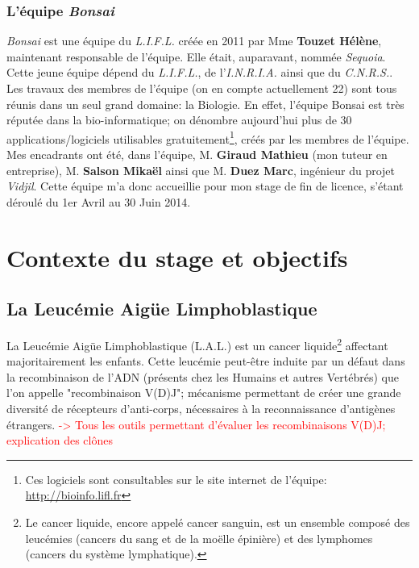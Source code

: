 \documentclass[12pt]{report}
\begin{document}
\begin{spacing}{1.2}
\subsection{L'équipe \textit{Bonsai}}
\textit{Bonsai} est une équipe du \textit{L.I.F.L.} créée en 2011 par Mme \textbf{Touzet Hélène}, maintenant responsable de l'équipe. Elle était, auparavant, nommée \textit{Sequoia}.
\newline
Cette jeune équipe dépend du \textit{L.I.F.L.}, de l'\textit{I.N.R.I.A.} ainsi que du \textit{C.N.R.S.}.
\newline
Les travaux des membres de l'équipe (on en compte actuellement 22) sont tous réunis dans un seul grand domaine: la Biologie.
\newline
En effet, l'équipe Bonsai est très réputée dans la bio-informatique; on dénombre aujourd'hui plus de 30 applications/logiciels utilisables gratuitement\footnote{Ces logiciels sont consultables sur le site internet de l'équipe: \url{http://bioinfo.lifl.fr}}, créés par les membres de l'équipe.
\newline
Mes encadrants ont été, dans l'équipe, M. \textbf{Giraud Mathieu} (mon tuteur en entreprise), M. \textbf{Salson Mikaël} ainsi que M. \textbf{Duez Marc}, ingénieur du projet \textit{Vidjil}.
\newline
Cette équipe m'a donc accueillie pour mon stage de fin de licence, s'étant déroulé du 1er Avril au 30 Juin 2014.


\chapter{Contexte du stage et objectifs}

\section{La Leucémie Aigüe Limphoblastique}
La Leucémie Aigüe Limphoblastique (L.A.L.) est un cancer liquide\footnote{Le cancer liquide, encore appelé cancer sanguin, est un ensemble composé des leucémies (cancers du sang et de la moëlle épinière) et des lymphomes (cancers du système lymphatique).} affectant majoritairement les enfants.
\newline
Cette leucémie peut-être induite par un défaut dans la recombinaison de l'ADN (présents chez les Humains et autres Vertébrés) que l'on appelle "recombinaison V(D)J"; mécanisme permettant de créer une grande diversité de récepteurs d'anti-corps, nécessaires à la reconnaissance d'antigènes étrangers.
\newline
\textcolor{red}{-> Tous les outils permettant d'évaluer les recombinaisons V(D)J; explication des clônes}


\end{spacing}
\end{document}

